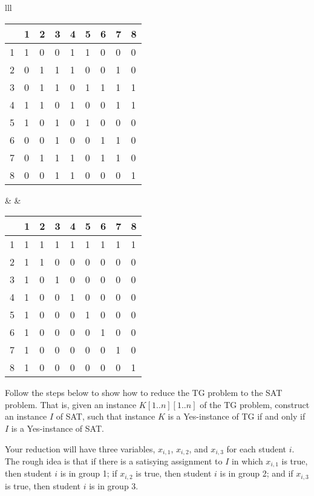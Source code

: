 \documentclass[11pt,fleqn]{exam}
\begin{document}
\begin{center}
\begin{tabular}{lll}
\begin{tabular}{l|llllllll}
&     1 & 2 & 3 & 4 & 5 & 6 & 7 & 8 \\ \hline
1 &   1 & 0 & 0 & 1 & 1 & 0 & 0 & 0 \\
2 &   0 & 1 & 1 & 1 & 0 & 0 & 1 & 0 \\
3 &   0 & 1 & 1 & 0 & 1 & 1 & 1 & 1 \\
4 &   1 & 1 & 0 & 1 & 0 & 0 & 1 & 1 \\
5 &   1 & 0 & 1 & 0 & 1 & 0 & 0 & 0 \\
6 &   0 & 0 & 1 & 0 & 0 & 1 & 1 & 0 \\
7 &   0 & 1 & 1 & 1 & 0 & 1 & 1 & 0 \\
8 &   0 & 0 & 1 & 1 & 0 & 0 & 0 & 1
\end{tabular}
&
\hspace{.5in}
&
\begin{tabular}{l|llllllll}
&     1 & 2 & 3 & 4 & 5 & 6 & 7 & 8 \\ \hline
1 &   1 & 1 & 1 & 1 & 1 & 1 & 1 & 1 \\
2 &   1 & 1 & 0 & 0 & 0 & 0 & 0 & 0 \\
3 &   1 & 0 & 1 & 0 & 0 & 0 & 0 & 0 \\
4 &   1 & 0 & 0 & 1 & 0 & 0 & 0 & 0 \\
5 &   1 & 0 & 0 & 0 & 1 & 0 & 0 & 0 \\
6 &   1 & 0 & 0 & 0 & 0 & 1 & 0 & 0 \\
7 &   1 & 0 & 0 & 0 & 0 & 0 & 1 & 0 \\
8 &   1 & 0 & 0 & 0 & 0 & 0 & 0 & 1 \\
\end{tabular}
\end{tabular}
\end{center}

Follow the steps below to show how to reduce the TG problem to the SAT problem. That is, given an instance $K[1..n][1..n]$ of the TG problem, construct an instance $I$ of SAT, such that
instance $K$ is a Yes-instance of TG if and only if $I$ is a Yes-instance of SAT.

Your reduction will have three variables, $x_{i,1}$, $x_{i,2}$, and $x_{i,3}$ for each student $i$. The rough idea is that if there is a satisying assignment to $I$ in which $x_{i,1}$ is true, then student $i$ is in group 1; if $x_{i,2}$ is true, then student $i$ is in group 2; and if $x_{i,3}$ is true, then student $i$ is in group 3.
\end{document}
